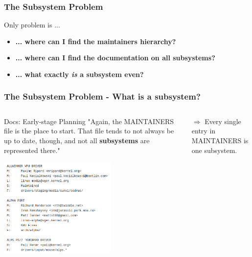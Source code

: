 \documentclass{beamer}
\begin{document}
	\begin{frame}
	\frametitle{The Subsystem Problem}
		\begin{alertblock}{Only problem is ...}
			\begin{itemize}
				\item \textbf{... where can I find the maintainers hierarchy?}
				\item \textbf{... where can I find the documentation on all subsystems?}
				\item \textbf{... what exactly \textit{is} a subsystem even?}
			\end{itemize}
		\end{alertblock}
	\end{frame}


	\begin{frame}
	\frametitle{The Subsystem Problem - What is a subsystem?}


	\begin{columns}
		\begin{column}{0.55\textwidth}
			\begin{block}{Docs: Early-stage Planning}
			"Again, the MAINTAINERS file is	the place to start.  That file tends to not always be up to date, though, and not all \textbf{subsystems} are represented there."
			\end{block}
     		\includegraphics[width=0.6\textwidth]{pics/MAINTAINERSbild.png}
		\end{column}
		\begin{column}{0.4\textwidth}
		$\Rightarrow$ Every single entry in MAINTAINERS is one subsystem.
		\end{column}
	\end{columns}
	\end{frame}
\end{document}
